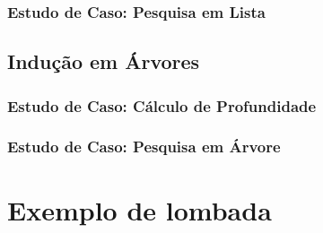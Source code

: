 \documentclass[times,english,brazil,oneside,section=TITLE]{ifes8}
\begin{document}
\blindtext[2]

\subsection{Estudo de Caso: Pesquisa em Lista}

\blindtext[2]

\section{Indução em Árvores}

\blindtext[2]

\subsection{Estudo de Caso: Cálculo de Profundidade}

\blindtext[2]

\subsection{Estudo de Caso: Pesquisa em Árvore}

\blindtext[2]


\anexos

\partanexos*

\chapter{Exemplo de lombada}

\hspace*{0mm}
\end{document}
